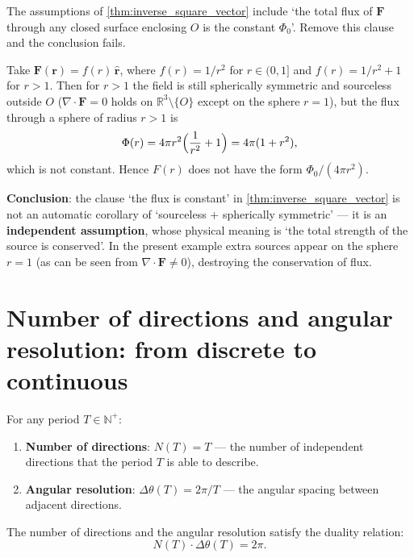 \begin{example}\label{ex:inverse_square_needs_const_flux}
The assumptions of \cref{thm:inverse_square_vector} include `the total flux of $\mathbf F$ through any closed surface enclosing $O$ is the constant $\Phi_0$'. Remove this clause and the conclusion fails.

Take $\mathbf F(\mathbf r) = f(r)\,\hat{\mathbf r}$, where $f(r) = 1/r^2$ for $r\in(0,1]$ and $f(r)=1/r^2+1$ for $r>1$. Then for $r>1$ the field is still spherically symmetric and sourceless outside $O$ ($\nabla\cdot\mathbf F=0$ holds on $\mathbb R^3\setminus\{O\}$ except on the sphere $r=1$), but the flux through a sphere of radius $r>1$ is
\[
\Phi(r) = 4\pi r^2\Bigl(\frac{1}{r^2}+1\Bigr) = 4\pi(1+r^2),
\]
which is not constant. Hence $F(r)$ does not have the form $\Phi_0/(4\pi r^2)$.

\textbf{Conclusion}: the clause `the flux is constant' in \cref{thm:inverse_square_vector} is not an automatic corollary of `sourceless + spherically symmetric' --- it is an \textbf{independent assumption}, whose physical meaning is `the total strength of the source is conserved'. In the present example extra sources appear on the sphere $r=1$ (as can be seen from $\nabla\cdot\mathbf F\ne0$), destroying the conservation of flux.
\end{example}

\section{Number of directions and angular resolution: from discrete to continuous}

\begin{definition}\label{def:width_bandwidth}
For any period $T \in \mathbb{N}^+$:
\begin{enumerate}[label=(\roman*)]
    \item \textbf{Number of directions}: $N(T) = T$ --- the number of independent directions that the period $T$ is able to describe.
    \item \textbf{Angular resolution}: $\Delta\theta(T) = 2\pi/T$ --- the angular spacing between adjacent directions.
\end{enumerate}
The number of directions and the angular resolution satisfy the duality relation:
\[
N(T) \cdot \Delta\theta(T) = 2\pi.
\]
\end{definition}

